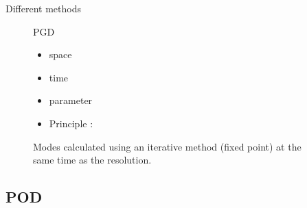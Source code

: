 \documentclass[12pt]{beamer}
\begin{document}
\begin{frame}{Different methods}
\begin{figure}
\begin{minipage}{0.47\linewidth}
\begin{exampleblock}{PGD}
{\begin{itemize}
\begin{itemize}
					\item space
					\item time
					\item parameter
					\end{itemize}
			\end{itemize}
			\begin{itemize}
			\item Principle :
			\end{itemize}
			Modes calculated using an iterative method (fixed point)
			 at the same time as the resolution.	
			\vfill
		}
		\end{exampleblock}
   \end{minipage}
\end{figure}

\end{frame}


\subsection{POD}
\end{document}
